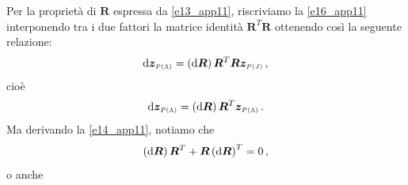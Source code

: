 Per la propriet\`a di $\bm R$ espressa da \ref{e13_app11}, riscriviamo
la \ref{e16_app11} interponendo tra i due fattori la matrice identit\`a
$\bm{R}^T\bm{R}$ ottenendo cos\`i la seguente relazione:
\begin{equation}
{\rm d}{\bm{z}}_{\scriptscriptstyle{P(\Lambda)}}=
\left({\rm d}\bm{R}\right)\bm{R}^T\bm{R}{\bm{z}}_{\scriptscriptstyle{P(J)}}
\,,
\label{e17_app11}
\end{equation}
\noindent cio\`e
\begin{equation}
{\rm d}{\bm{z}}_{\scriptscriptstyle{P(\Lambda)}}=
\left({\rm d}\bm{R}\right)\bm{R}^T{\bm{z}}_{\scriptscriptstyle{P(\Lambda)}}
\,.
\label{e18_app11}
\end{equation}
\noindent Ma derivando la \ref{e14_app11}, notiamo che
\begin{equation}
\left({\rm d}\bm{R}\right)\bm{R}^T+
\bm{R}\left({\rm d}\bm{R}\right)^T=0\,,
\label{e19_app11}
\end{equation}
\noindent o anche


